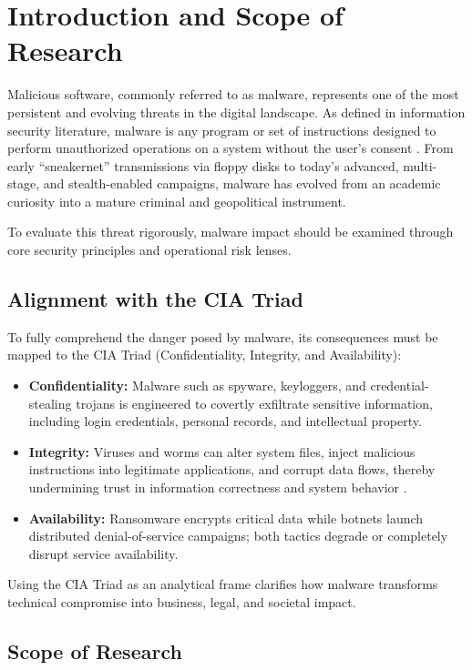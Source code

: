 \section{Introduction and Scope of Research}

Malicious software, commonly referred to as malware, represents one of the most persistent and evolving threats in the digital landscape.
As defined in information security literature, malware is any program or set of instructions designed to perform unauthorized operations on a system without the user's consent \cite{ref1}.
From early ``sneakernet'' transmissions via floppy disks to today's advanced, multi-stage, and stealth-enabled campaigns,
malware has evolved from an academic curiosity into a mature criminal and geopolitical instrument.

To evaluate this threat rigorously, malware impact should be examined through core security principles and operational risk lenses.

\subsection{Alignment with the CIA Triad}

To fully comprehend the danger posed by malware, its consequences must be mapped to the CIA Triad (Confidentiality, Integrity, and Availability):

\begin{itemize}
	\item \textbf{Confidentiality:} Malware such as spyware, keyloggers, and credential-stealing trojans is engineered to covertly exfiltrate sensitive information, including login credentials, personal records, and intellectual property.
	\item \textbf{Integrity:} Viruses and worms can alter system files, inject malicious instructions into legitimate applications, and corrupt data flows, thereby undermining trust in information correctness and system behavior \cite{ref1}.
	\item \textbf{Availability:} Ransomware encrypts critical data while botnets launch distributed denial-of-service campaigns; both tactics degrade or completely disrupt service availability.
\end{itemize}

Using the CIA Triad as an analytical frame clarifies how malware transforms technical compromise into business, legal, and societal impact.

\subsection{Scope of Research}

